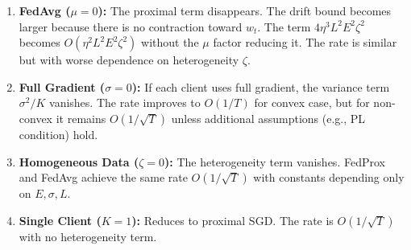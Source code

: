 \documentclass{article}
\begin{document}
\begin{enumerate}
    \item \textbf{FedAvg ($\mu=0$):} The proximal term disappears. The drift bound becomes larger because there is no contraction toward $w_t$. The term $4 \eta^3 L^2 E^2 \zeta^2$ becomes $O(\eta^2 L^2 E^2 \zeta^2)$ without the $\mu$ factor reducing it. The rate is similar but with worse dependence on heterogeneity $\zeta$.
    \item \textbf{Full Gradient ($\sigma=0$):} If each client uses full gradient, the variance term $\sigma^2/K$ vanishes. The rate improves to $O(1/T)$ for convex case, but for non-convex it remains $O(1/\sqrt{T})$ unless additional assumptions (e.g., PL condition) hold.
    \item \textbf{Homogeneous Data ($\zeta=0$):} The heterogeneity term vanishes. FedProx and FedAvg achieve the same rate $O(1/\sqrt{T})$ with constants depending only on $E, \sigma, L$.
    \item \textbf{Single Client ($K=1$):} Reduces to proximal SGD. The rate is $O(1/\sqrt{T})$ with no heterogeneity term.
\end{enumerate}
\end{document}

